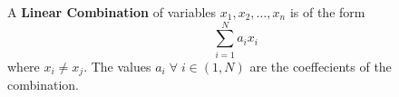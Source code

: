 \begin{definition}
    A \textbf{Linear Combination} of variables $x_1, x_2, \ldots, x_n$ is of the form
    \begin{equation}
        \sum_{i=1}^N a_i x_i
    \end{equation}
    where $x_i \neq x_j$. The values $a_i \; \forall \; i \in (1, N)$ are the coeffecients of the combination.
\end{definition}